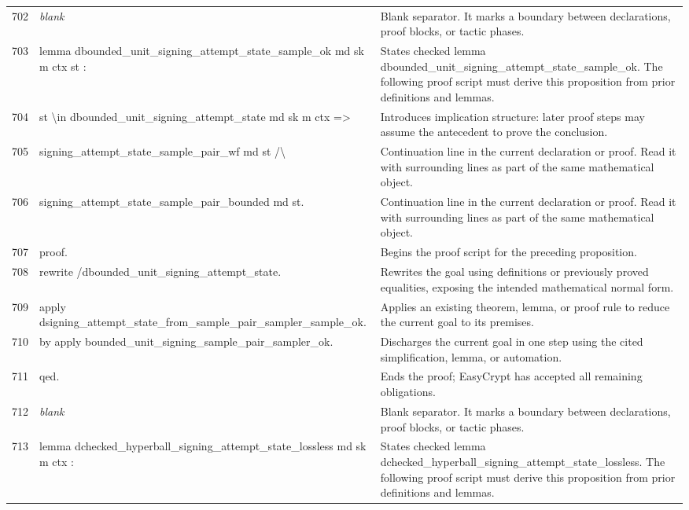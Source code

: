 \documentclass[10pt]{article}
\begin{document}
\begin{longtable}{r L{0.53\textwidth} L{0.37\textwidth}}
702 & {\ttfamily\scriptsize \emph{blank}} & Blank separator.  It marks a boundary between declarations, proof blocks, or tactic phases. \\
703 & {\ttfamily\scriptsize lemma dbounded\_unit\_signing\_attempt\_state\_sample\_ok md sk m ctx st :} & States checked lemma dbounded\_unit\_signing\_attempt\_state\_sample\_ok.  The following proof script must derive this proposition from prior definitions and lemmas. \\
704 & {\ttfamily\scriptsize   st \textbackslash{}in dbounded\_unit\_signing\_attempt\_state md sk m ctx =>} & Introduces implication structure: later proof steps may assume the antecedent to prove the conclusion. \\
705 & {\ttfamily\scriptsize   signing\_attempt\_state\_sample\_pair\_wf md st /\textbackslash{}} & Continuation line in the current declaration or proof.  Read it with surrounding lines as part of the same mathematical object. \\
706 & {\ttfamily\scriptsize   signing\_attempt\_state\_sample\_pair\_bounded md st.} & Continuation line in the current declaration or proof.  Read it with surrounding lines as part of the same mathematical object. \\
707 & {\ttfamily\scriptsize proof.} & Begins the proof script for the preceding proposition. \\
708 & {\ttfamily\scriptsize rewrite /dbounded\_unit\_signing\_attempt\_state.} & Rewrites the goal using definitions or previously proved equalities, exposing the intended mathematical normal form. \\
709 & {\ttfamily\scriptsize apply dsigning\_attempt\_state\_from\_sample\_pair\_sampler\_sample\_ok.} & Applies an existing theorem, lemma, or proof rule to reduce the current goal to its premises. \\
710 & {\ttfamily\scriptsize by apply bounded\_unit\_signing\_sample\_pair\_sampler\_ok.} & Discharges the current goal in one step using the cited simplification, lemma, or automation. \\
711 & {\ttfamily\scriptsize qed.} & Ends the proof; EasyCrypt has accepted all remaining obligations. \\
712 & {\ttfamily\scriptsize \emph{blank}} & Blank separator.  It marks a boundary between declarations, proof blocks, or tactic phases. \\
713 & {\ttfamily\scriptsize lemma dchecked\_hyperball\_signing\_attempt\_state\_lossless md sk m ctx :} & States checked lemma dchecked\_hyperball\_signing\_attempt\_state\_lossless.  The following proof script must derive this proposition from prior definitions and lemmas. \\

\end{longtable}
\end{document}
